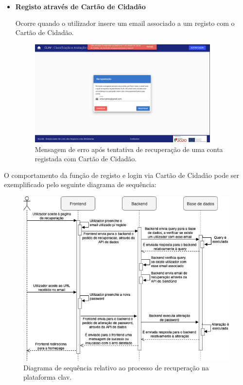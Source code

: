 \begin{itemize}
\begin{itemize}
        \vspace{-5mm}
        \item \textbf{Registo através de Cartão de Cidadão}
        
        Ocorre quando o utilizador insere um email associado a um registo com o Cartão de Cidadão.
    
        \vspace{-2mm}
        \begin{figure}[H]
            \centering
            \includegraphics[width=0.9\textwidth]{img/clav/authCC/erroRecuperacao.png}
            \caption{Mensagem de erro após tentativa de recuperação de uma conta registada com Cartão de Cidadão.}
            \label{fig:pagRecuperacaoErroCC}
        \end{figure}
    \end{itemize}
\end{itemize}

O comportamento da função de registo e login via Cartão de Cidadão pode ser exemplificado pelo seguinte diagrama de sequência:

\vspace{10mm}

\begin{figure}[H]
    \centering
    \includegraphics[width=\textwidth]{img/diagramas/sequencia/DiagramasSequencia-Recuperacao.png}
    \caption{Diagrama de sequência relativo ao processo de recuperação na plataforma \gls{clav}.}
    \label{fig:diagramaSequenciaCC}
\end{figure}

